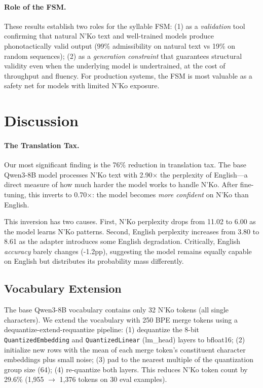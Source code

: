 \documentclass[11pt]{article}
\begin{document}
\paragraph{Role of the FSM.}
These results establish two roles for the syllable FSM:
(1) as a \textit{validation} tool confirming that natural N'Ko text and well-trained models produce phonotactically valid output (99\% admissibility on natural text vs 19\% on random sequences);
(2) as a \textit{generation constraint} that guarantees structural validity even when the underlying model is undertrained, at the cost of throughput and fluency.
For production systems, the FSM is most valuable as a safety net for models with limited N'Ko exposure.

\section{Discussion}

\paragraph{The Translation Tax.}
Our most significant finding is the 76\% reduction in translation tax.
The base Qwen3-8B model processes N'Ko text with 2.90$\times$ the perplexity of English---a direct measure of how much harder the model works to handle N'Ko.
After fine-tuning, this inverts to 0.70$\times$: the model becomes \textit{more confident} on N'Ko than English.

This inversion has two causes.
First, N'Ko perplexity drops from 11.02 to 6.00 as the model learns N'Ko patterns.
Second, English perplexity increases from 3.80 to 8.61 as the adapter introduces some English degradation.
Critically, English \textit{accuracy} barely changes (-1.2pp), suggesting the model remains equally capable on English but distributes its probability mass differently.

\subsection{Vocabulary Extension}
\label{sec:vocab-ext}

The base Qwen3-8B vocabulary contains only 32 N'Ko tokens (all single characters).
We extend the vocabulary with 250 BPE merge tokens using a dequantize-extend-requantize pipeline:
(1) dequantize the 8-bit \texttt{QuantizedEmbedding} and \texttt{QuantizedLinear} (lm\_head) layers to bfloat16;
(2) initialize new rows with the mean of each merge token's constituent character embeddings plus small noise;
(3) pad to the nearest multiple of the quantization group size (64);
(4) re-quantize both layers.
This reduces N'Ko token count by 29.6\% (1,955 $\to$ 1,376 tokens on 30 eval examples).
\end{document}
